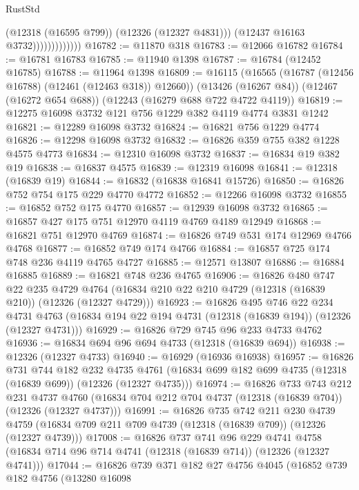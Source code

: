 \begin{lexlean}{RustStd}
\begin{coremodule}
                              (@12318 (@16595 @799))
                              (@12326 (@12327 @4831)))
                            (@12437 @16163 @3732)))))))))))))
@16782 := @11870 @318
@16783 := @12066 @16782
@16784 := @16781 @16783
@16785 := @11940 @1398
@16787 := @16784 (@12452 @16785)
@16788 := @11964 @1398
@16809 := @16115
    (@16565 (@16787 (@12456 @16788) (@12461 (@12463 @318)) @12660))
    (@13426 (@16267 @84))
    (@12467 (@16272 @654 @688))
    (@12243 (@16279 @688 @722 @4722 @4119))
@16819 := @12275 @16098 @3732 @121 @756 @1229 @382 @4119 @4774 @3831 @1242
@16821 := @12289 @16098 @3732
@16824 := @16821 @756 @1229 @4774
@16826 := @12298 @16098 @3732
@16832 := @16826 @359 @755 @382 @1228 @4575 @4773
@16834 := @12310 @16098 @3732
@16837 := @16834 @19 @382 @19
@16838 := @16837 @4575
@16839 := @12319 @16098
@16841 := @12318 (@16839 @19)
@16844 := @16832 (@16838 @16841 @15726)
@16850 := @16826 @752 @754 @175 @229 @4770 @4772
@16852 := @12266 @16098 @3732
@16855 := @16852 @752 @175 @4770
@16857 := @12939 @16098 @3732
@16865 := @16857 @427 @175 @751 @12970 @4119 @4769 @4189 @12949
@16868 := @16821 @751 @12970 @4769
@16874 := @16826 @749 @531 @174 @12969 @4766 @4768
@16877 := @16852 @749 @174 @4766
@16884 := @16857 @725 @174 @748 @236 @4119 @4765 @4727
@16885 := @12571 @13807
@16886 := @16884 @16885
@16889 := @16821 @748 @236 @4765
@16906 := @16826
    @480
    @747
    @22
    @235
    @4729
    @4764
    (@16834 @210 @22 @210 @4729 (@12318 (@16839 @210)) (@12326 (@12327 @4729)))
@16923 := @16826
    @495
    @746
    @22
    @234
    @4731
    @4763
    (@16834 @194 @22 @194 @4731 (@12318 (@16839 @194)) (@12326 (@12327 @4731)))
@16929 := @16826 @729 @745 @96 @233 @4733 @4762
@16936 := @16834 @694 @96 @694 @4733 (@12318 (@16839 @694))
@16938 := @12326 (@12327 @4733)
@16940 := @16929 (@16936 @16938)
@16957 := @16826
    @731
    @744
    @182
    @232
    @4735
    @4761
    (@16834 @699 @182 @699 @4735 (@12318 (@16839 @699)) (@12326 (@12327 @4735)))
@16974 := @16826
    @733
    @743
    @212
    @231
    @4737
    @4760
    (@16834 @704 @212 @704 @4737 (@12318 (@16839 @704)) (@12326 (@12327 @4737)))
@16991 := @16826
    @735
    @742
    @211
    @230
    @4739
    @4759
    (@16834 @709 @211 @709 @4739 (@12318 (@16839 @709)) (@12326 (@12327 @4739)))
@17008 := @16826
    @737
    @741
    @96
    @229
    @4741
    @4758
    (@16834 @714 @96 @714 @4741 (@12318 (@16839 @714)) (@12326 (@12327 @4741)))
@17044 := @16826
    @739
    @371
    @182
    @27
    @4756
    @4045
    (@16852
      @739
      @182
      @4756
      (@13280
        @16098

\end{coremodule}
\end{lexlean}
